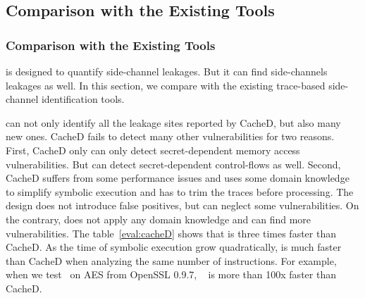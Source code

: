 \subsection{Comparison with the Existing Tools}
\label{eval:scala}


\subsubsection{Comparison with the Existing Tools}
\tool{} is designed to quantify side-channel leakages. But it can find
side-channels leakages as well. In this section, we compare \tool{} with the
existing trace-based side-channel identification tools.

\tool{} can not only identify all the leakage sites reported by CacheD, but also
many new ones. CacheD fails to detect many other vulnerabilities for two
reasons. First, CacheD only can only detect secret-dependent memory access
vulnerabilities. But \tool{} can detect secret-dependent control-flows as well.
Second, CacheD suffers from some performance issues and uses some domain
knowledge to simplify symbolic execution and has to trim the traces before
processing. The design does not introduce false positives, but can neglect some
vulnerabilities. On the contrary, \tool{} does not apply any domain knowledge
and can find more vulnerabilities. The table~\ref{eval:cacheD} shows that
\tool{} is three times faster than CacheD. As the time of symbolic execution
grow quadratically, \tool{} is much faster than CacheD when analyzing the same
number of instructions. For example, when we test~\tool{} on AES from OpenSSL
0.9.7, ~\tool{} is more than 100x faster than CacheD.


